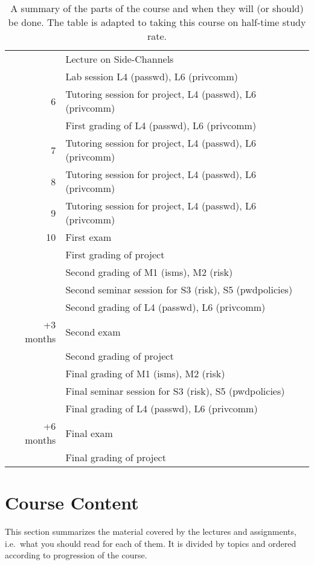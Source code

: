 \documentclass[a4paper,logo]{miunart}
\begin{document}
\begin{table}
\begin{tabular}{rp{9cm}}
      & Lecture on Side-Channels\\
      & Lab session L4 (passwd), L6 (privcomm)\\
    \midrule
    6
      & Tutoring session for project, L4 (passwd), L6 (privcomm)\\
      & First grading of L4 (passwd), L6 (privcomm)\\
    \midrule
    7
      & Tutoring session for project, L4 (passwd), L6 (privcomm)\\
    \midrule
    8
      & Tutoring session for project, L4 (passwd), L6 (privcomm)\\
    \midrule
    9
      & Tutoring session for project, L4 (passwd), L6 (privcomm)\\
    \midrule
    10
      & First exam\\
      & First grading of project\\
      & Second grading of M1 (isms), M2 (risk)\\
      & Second seminar session for S3 (risk), S5 (pwdpolicies)\\
      & Second grading of L4 (passwd), L6 (privcomm)\\
    \midrule
    +3 months
      & Second exam\\
      & Second grading of project\\
      & Final grading of M1 (isms), M2 (risk)\\
      & Final seminar session for S3 (risk), S5 (pwdpolicies)\\
      & Final grading of L4 (passwd), L6 (privcomm)\\
    \midrule
    +6 months
      & Final exam\\
      & Final grading of project\\
    \bottomrule
  \end{tabular}
  \caption{%
    A summary of the parts of the course and when they will (or should) be 
    done.
    The table is adapted to taking this course on half-time study rate.
  }
  \label{tbl:schedule}
\end{table}


\section{Course Content}

This section summarizes the material covered by the lectures and assignments, 
i.e.~what you should read for each of them.
It is divided by topics and ordered according to progression of the course.
\end{document}
